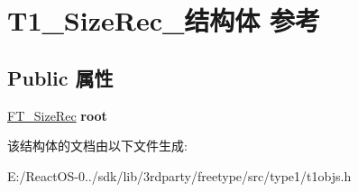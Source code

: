 \hypertarget{struct_t1___size_rec__}{}\section{T1\+\_\+\+Size\+Rec\+\_\+结构体 参考}
\label{struct_t1___size_rec__}
\subsection*{Public 属性}
\begin{DoxyCompactItemize}
\item 
\mbox{\label{struct_t1___size_rec___ae0aa203127356e95060d5e1706f5705c}} 
\hyperlink{struct_f_t___size_rec__}{F\+T\+\_\+\+Size\+Rec} {\bfseries root}
\end{DoxyCompactItemize}


该结构体的文档由以下文件生成\+:\begin{DoxyCompactItemize}
\item 
E\+:/\+React\+O\+S-\/0../sdk/lib/3rdparty/freetype/src/type1/t1objs.\+h\end{DoxyCompactItemize}
